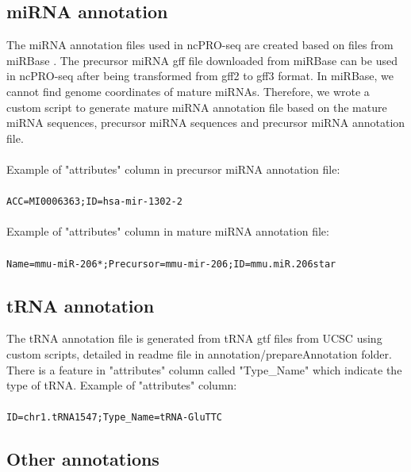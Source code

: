 \documentclass[12pt]{article}
\def \ncpip{ncPRO-seq}
\begin{document}
\subsection{miRNA annotation}
\label{subsection:mirna}
The miRNA annotation files used in \ncpip{} are created based on files from miRBase \cite{Kozomara2011}. The precursor miRNA gff file downloaded from miRBase can be used in \ncpip{} after being transformed from gff2 to gff3 format. In miRBase, we cannot find genome coordinates of mature miRNAs. Therefore, we wrote a custom script to generate mature miRNA annotation file based on the mature miRNA sequences, precursor miRNA sequences and precursor miRNA annotation file. \\\\
Example of "attributes" column in precursor miRNA annotation file:\\\\
\verb|ACC=MI0006363;ID=hsa-mir-1302-2|\\\\
Example of "attributes" column in mature miRNA annotation file:\\\\
\verb|Name=mmu-miR-206*;Precursor=mmu-mir-206;ID=mmu.miR.206star|

\subsection{tRNA annotation}
\label{subsection:trna}
The tRNA annotation file is generated from tRNA gtf files from UCSC \cite{Dreszer2012} using custom scripts, detailed in readme file in annotation/prepareAnnotation folder. There is a feature in "attributes" column called "Type\_Name" which indicate the type of tRNA. Example of "attributes" column: \\\\
\verb|ID=chr1.tRNA1547;Type_Name=tRNA-GluTTC|

\subsection{Other annotations}
\end{document}
